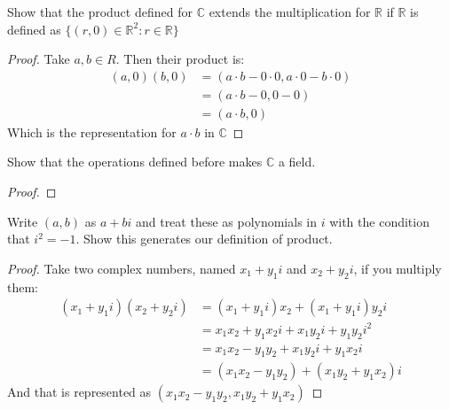 \documentclass{tufte-handout}
\begin{document}
\begin{problem}
	Show that the product defined for $\mathbb{C}$ extends the multiplication for $\mathbb{R}$ if $\mathbb{R}$ is defined as $\{(r, 0) \in \mathbb{R}^2 : r \in \mathbb{R}\}$
\end{problem}
\begin{proof}
	Take $a, b \in R$. Then their product is:
	\begin{align*}
		(a, 0)(b, 0) &= (a\cdot b - 0\cdot 0, a\cdot 0 - b\cdot 0)\\
		&= (a\cdot b - 0, 0-0)\\
		&= (a\cdot b, 0)
	\end{align*}
	Which is the representation for $a\cdot b$ in $\mathbb{C}$
\end{proof}
\begin{problem}
	Show that the operations defined before makes $\mathbb{C}$ a field.
\end{problem}
\begin{proof}
	
\end{proof}

\begin{problem}
	Write $(a, b)$ as $a + bi$ and treat these as polynomials in $i$ with the condition that $i^2 = -1$. Show this generates our definition of product.
\end{problem}
\begin{proof}
	Take two complex numbers, named $x_1 + y_1i$ and $x_2 + y_2i$, if you multiply them:
	\begin{align*}
		(x_1+y_1i)(x_2+y_2i) &= (x_1+y_1i)x_2 + (x_1+y_1i)y_2i\\
		&= x_1x_2 + y_1x_2i + x_1y_2i + y_1y_2i^2\\
		&= x_1x_2 - y_1y_2 + x_1y_2i + y_1x_2i\\
		&= (x_1x_2 - y_1y_2) + (x_1y_2 + y_1x_2)i
	\end{align*}
	And that is represented as $(x_1x_2 - y_1y_2, x_1y_2 + y_1x_2)$
\end{proof}
\end{document}
